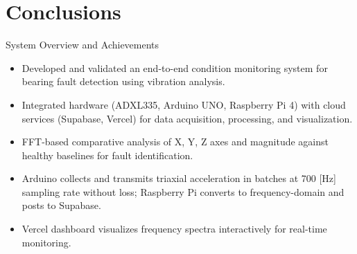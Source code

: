 \documentclass{beamer}
\begin{document}
	\section{Conclusions}
	\begin{frame}{System Overview and Achievements}
		\begin{itemize}[<+-| alert@+>]
			\item Developed and validated an end-to-end condition monitoring system for bearing fault detection using vibration analysis.
			\item Integrated hardware (ADXL335, Arduino UNO, Raspberry Pi 4) with cloud services (Supabase, Vercel) for data acquisition, processing, and visualization.
			\item FFT-based comparative analysis of X, Y, Z axes and magnitude against healthy baselines for fault identification.
			\item Arduino collects and transmits triaxial acceleration in batches at 700 [Hz] sampling rate without loss; Raspberry Pi converts to frequency-domain and posts to Supabase.
			\item Vercel dashboard visualizes frequency spectra interactively for real-time monitoring.
		\end{itemize}
	\end{frame}


	
\end{document}
